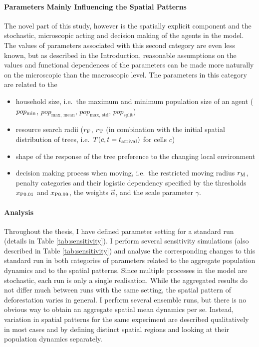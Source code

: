 \paragraph{Parameters Mainly Influencing the Spatial Patterns}
The novel part of this study, however is the spatially explicit component and the stochastic, microscopic acting and decision making of the agents in the model.
The values of parameters associated with this second category are even less known, but as described in the Introduction, reasonable assumptions on the values and functional dependences of the parameters can be made more naturally on the microscopic than the macroscopic level. The parameters in this category are related to the
\begin{itemize}
	\item household size, i.e.\ the maximum and minimum population size  of an agent ($pop_{\rm min}$, $pop_\text{max, mean}$, $pop_\text{max, std}$, $pop_\text{split}$)
	\item resource search radii ($r_{\rm F}$, $r_{\rm T}$ (in combination with the initial spatial distribution of trees, i.e.\ $T(c,t=t_{\rm arrival})$ for cells $c$)
	\item shape of the response of the tree preference to the changing local environment
	\item decision making process when moving, i.e.\ the restricted moving radius $r_{\rm M}$, penalty categories and their logistic dependency specified by the thresholds $x_{\rm P0.01}$ and $x_{\rm P0.99}$, the weights $\vec{\alpha}$, and the scale parameter $\gamma$.
\end{itemize}

\paragraph{Analysis}
Throughout the thesis, I have defined parameter setting for a standard run (details in Table \ref{tab:sensitivity}).
I perform several sensitivity simulations (also described in Table \ref{tab:sensitivity}) and analyse the corresponding changes to this standard run in both categories of parameters related to the aggregate population dynamics and to the spatial patterns.
Since multiple processes in the model are stochastic, each run is only a single realisation. 
While the aggregated results do not differ much between runs with the same setting, the spatial pattern of deforestation varies in general. 
I perform several ensemble runs, but there is no obvious way to obtain an aggregate spatial mean dynamics per se.
Instead, variation in spatial patterns for the same experiment are described qualitatively in most cases and by defining distinct spatial regions and looking at their population dynamics separately. 




